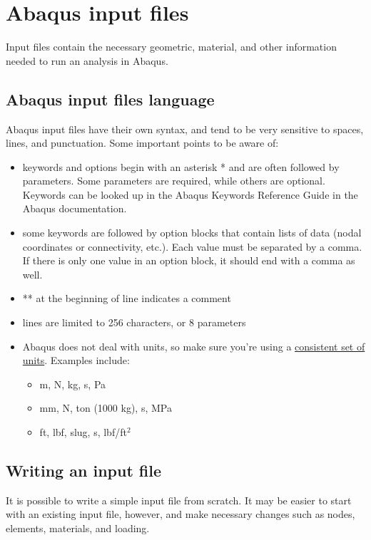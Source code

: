 \documentclass[10pt,letterpaper,oneside]{report}
\begin{document}
\section{Abaqus input files}
Input files contain the necessary geometric, material, and other information needed to run an analysis in Abaqus.  

\subsection{Abaqus input files language}
Abaqus input files have their own syntax, and tend to be very sensitive to spaces, lines, and punctuation.  Some important points to be aware of: 
\begin{itemize}
\item keywords and options begin with an asterisk * and are often followed by parameters.  Some parameters are required, while others are optional.  Keywords can be looked up in the Abaqus Keywords Reference Guide \autocite{AbaqusKeywords} in the Abaqus documentation.  
\item some keywords are followed by option blocks that contain lists of data (nodal coordinates or connectivity, etc.).  Each value must be separated by a comma.  If there is only one value in an option block, it should end with a comma as well.  
\item ** at the beginning of line indicates a comment
\item lines are limited to 256 characters, or 8 parameters
\item Abaqus does not deal with units, so make sure you're using a \href{https://caeai.com/blog/tips-tricks-consistent-fea-units}{consistent set of units}.  Examples include: 
  \begin{itemize}
  \item m, N, kg, s, Pa
  \item mm, N, ton (1000 kg), s, MPa
  \item ft, lbf, slug, s, lbf/ft$^2$
  \end{itemize}
\end{itemize}

\subsection{Writing an input file}
It is possible to write a simple input file from scratch.  It may be easier to start with an existing input file, however, and make necessary changes such as nodes, elements, materials, and loading.
\end{document}
